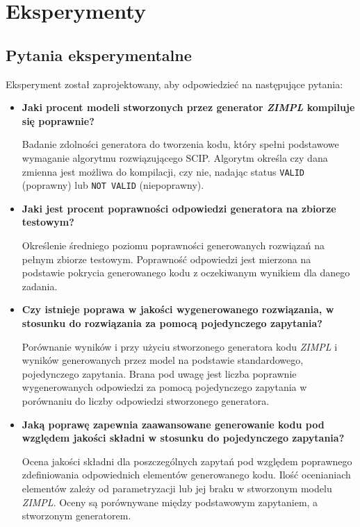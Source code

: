 
\chapter{Eksperymenty}\label{ch:experiment}

\section{Pytania eksperymentalne}

Eksperyment został zaprojektowany, aby odpowiedzieć na następujące pytania:
\begin{itemize}
    \item \textbf{Jaki procent modeli stworzonych przez generator  \textit{ZIMPL} kompiluje się poprawnie?}

Badanie zdolności generatora do tworzenia kodu, który spełni podstawowe wymaganie algorytmu rozwiązującego SCIP. Algorytm określa czy dana zmienna jest możliwa do kompilacji, czy nie, nadając status \texttt{VALID} (poprawny) lub \texttt{NOT VALID} (niepoprawny).

    \item \textbf{Jaki jest procent poprawności odpowiedzi generatora na zbiorze testowym?}

 Określenie średniego poziomu poprawności generowanych rozwiązań na pełnym zbiorze testowym. Poprawność odpowiedzi jest mierzona na podstawie pokrycia generowanego kodu z oczekiwanym wynikiem dla danego zadania.
    
    \item \textbf{Czy istnieje poprawa w jakości wygenerowanego rozwiązania, w stosunku do rozwiązania za pomocą pojedynczego zapytania?}

Porównanie wyników i przy użyciu stworzonego generatora kodu  \textit{ZIMPL} i wyników generowanych przez model na podstawie standardowego, pojedynczego zapytania. Brana pod uwagę jest liczba poprawnie wygenerowanych odpowiedzi za pomocą pojedynczego zapytania w porównaniu do liczby odpowiedzi stworzonego generatora.
    
    \item \textbf{Jaką poprawę zapewnia zaawansowane generowanie kodu pod względem jakości składni w stosunku do pojedynczego zapytania?}

Ocena jakości składni dla poszczególnych zapytań pod względem poprawnego zdefiniowania odpowiednich elementów generowanego kodu. Ilość ocenianiach elementów zależy od parametryzacji lub jej braku w stworzonym modelu  \textit{ZIMPL}. Oceny są porównywane między podstawowym zapytaniem, a stworzonym generatorem.
    
\end{itemize}

